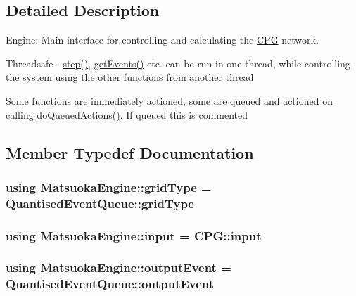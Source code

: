 \subsection{Detailed Description}
Engine\+: Main interface for controlling and calculating the \hyperlink{classCPG}{C\+PG} network. 

Threadsafe -\/ \hyperlink{classMatsuokaEngine_a4fa468dc0814f1ad92594f7a4d5abd00}{step()}, \hyperlink{classMatsuokaEngine_a70444163eee59d0df5b282bb8696f5a1}{get\+Events()} etc. can be run in one thread, while controlling the system using the other functions from another thread

Some functions are immediately actioned, some are queued and actioned on calling \hyperlink{classMatsuokaEngine_affd6ef89f68c1aa654229a07e0160f2e}{do\+Queued\+Actions()}. If queued this is commented 

\subsection{Member Typedef Documentation}
\subsubsection[{\texorpdfstring{grid\+Type}{gridType}}]{\setlength{\rightskip}{0pt plus 5cm}using {\bf Matsuoka\+Engine\+::grid\+Type} =  {\bf Quantised\+Event\+Queue\+::grid\+Type}}\hypertarget{classMatsuokaEngine_aaf41ce5bf63099a1d864e4eb91527cb5}{}\label{classMatsuokaEngine_aaf41ce5bf63099a1d864e4eb91527cb5}
\subsubsection[{\texorpdfstring{input}{input}}]{\setlength{\rightskip}{0pt plus 5cm}using {\bf Matsuoka\+Engine\+::input} =  {\bf C\+P\+G\+::input}}\hypertarget{classMatsuokaEngine_a811a5449f07004a2eb6b34e8c9bd862f}{}\label{classMatsuokaEngine_a811a5449f07004a2eb6b34e8c9bd862f}
\subsubsection[{\texorpdfstring{output\+Event}{outputEvent}}]{\setlength{\rightskip}{0pt plus 5cm}using {\bf Matsuoka\+Engine\+::output\+Event} =  {\bf Quantised\+Event\+Queue\+::output\+Event}}\hypertarget{classMatsuokaEngine_a09035e4918ce82c9378821c88375f843}{}\label{classMatsuokaEngine_a09035e4918ce82c9378821c88375f843}
